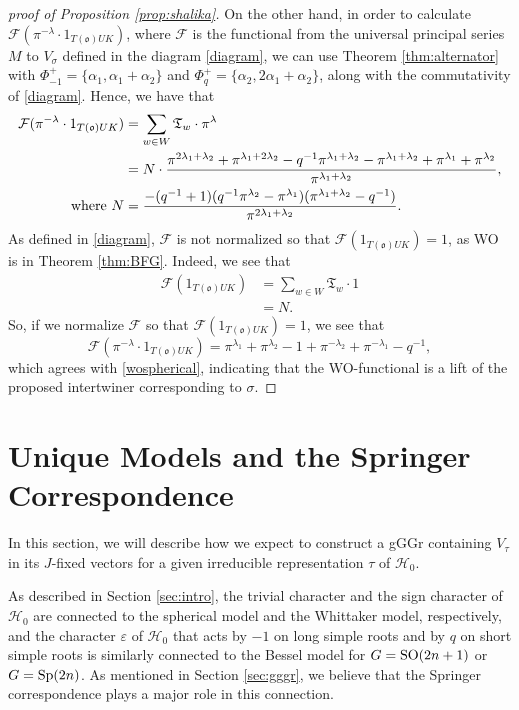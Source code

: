 \documentclass[11pt,letterpaper]{article}
\newcommand{\calH}{\mathcal{H}} %
\newcommand{\calF}{\mathcal{F}}
\newcommand{\ve}{\varepsilon}
\newcommand{\goth}{\mathfrak}
\newcommand{\SO}{\textup{SO}}
\newcommand{\Sp}{\textup{Sp}}
\theoremstyle{remark}
\numberwithin{equation}{section}
\begin{document}
\begin{proof}[proof of Proposition \ref{prop:shalika}]
On the other hand, in order to calculate $\calF(\pi^{-\lambda}\cdot 1_{T(\goth{o})UK})$, where $\calF$ is the functional from the universal principal series $M$ to $V_{\sigma}$ defined in the diagram \eqref{diagram}, we can use Theorem \ref{thm:alternator} with $\Phi_{-1}^{+} = \{\alpha_1,\alpha_1+\alpha_2\}$ and $\Phi_{q}^{+} = \{\alpha_2,2\alpha_1+\alpha_2\}$, along with the commutativity of \eqref{diagram}. Hence, we have that 
\begin{align*}
\calF(\pi^{-\lambda}\cdot 1_{T(\goth{o})UK}) &= \sum_{w \in W} \goth{T}_w \cdot \pi^{\lambda}
\\&= N\cdot \frac{\pi^{2\lambda_1+\lambda_2} + \pi^{\lambda_1+2\lambda_2} - q^{-1}\pi^{\lambda_1+\lambda_2} - \pi^{\lambda_1+\lambda_2} + \pi^{\lambda_1}+ \pi^{\lambda_2}}{\pi^{\lambda_1+\lambda_2}},
\\\textup{where } N &= \frac{-(q^{-1} + 1)(q^{-1}\pi^{\lambda_2} - \pi^{\lambda_1})(\pi^{\lambda_1+\lambda_2} - q^{-1})}{\pi^{2\lambda_1+\lambda_2}}.
\end{align*} As defined in \eqref{diagram}, $\calF$ is not normalized so that $\calF(1_{T(\goth{o})UK}) = 1$, as WO is in Theorem \ref{thm:BFG}. Indeed, we see that 
\begin{align*}
\calF(1_{T(\goth{o})UK}) &= \sum_{w \in W} \goth{T}_w \cdot 1
\\&= N.
\end{align*}
So, if we normalize $\calF$ so that $\calF(1_{T(\goth{o})UK}) = 1$, we see that $$\calF(\pi^{-\lambda}\cdot 1_{T(\goth{o})UK}) = \pi^{\lambda_1} + \pi^{\lambda_2}-1+\pi^{-\lambda_2}+\pi^{-\lambda_1}-q^{-1},$$ which agrees with \eqref{wospherical}, indicating that the WO-functional is a lift of the proposed intertwiner corresponding to $\sigma$.

\end{proof}


\section{Unique Models and the Springer Correspondence} \label{sec:springer}

In this section, we will describe how we expect to construct a gGGr containing $V_{\tau}$ in its $J$-fixed vectors for a given irreducible representation $\tau$ of $\calH_0$.

As described in Section \ref{sec:intro}, the trivial character and the sign character of $\calH_0$ are connected to the spherical model and the Whittaker model, respectively, and the character $\ve$ of $\calH_0$ that acts by $-1$ on long simple roots and by $q$ on short simple roots is similarly connected to the Bessel model for $G = \SO(2n+1)$ or $G = \Sp(2n)$. As mentioned in Section \ref{sec:gggr}, we believe that the Springer correspondence plays a major role in this connection. 
\end{document}
